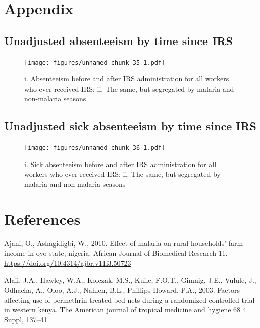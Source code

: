 \documentclass[]{article}
\begin{document}
\newpage

\section{Appendix}\label{appendix}

\subsection{Unadjusted absenteeism by time since
IRS}\label{unadjusted-absenteeism-by-time-since-irs}

\begin{figure}
\centering
\texttt{[image: figures/unnamed-chunk-35-1.pdf]}
\caption{i. Absenteeism before and after IRS administration for all
workers who ever received IRS; ii. The same, but segregated by malaria
and non-malaria seasons}
\end{figure}

\subsection{Unadjusted sick absenteeism by time since
IRS}\label{unadjusted-sick-absenteeism-by-time-since-irs}

\begin{figure}
\centering
\texttt{[image: figures/unnamed-chunk-36-1.pdf]}
\caption{i. Sick absenteeism before and after IRS administration for all
workers who ever received IRS; ii. The same, but segregated by malaria
and non-malaria seasons}
\end{figure}

\section*{References}\label{references}

\hypertarget{refs}{}
\hypertarget{ref-Ajani2010}{}
Ajani, O., Ashagidigbi, W., 2010. Effect of malaria on rural households'
farm income in oyo state, nigeria. African Journal of Biomedical
Research 11. \url{https://doi.org/10.4314/ajbr.v11i3.50723}

\hypertarget{ref-Alaii2003FactorsAU}{}
Alaii, J.A., Hawley, W.A., Kolczak, M.S., Kuile, F.O.T., Gimnig, J.E.,
Vulule, J., Odhacha, A., Oloo, A.J., Nahlen, B.L., Phillips-Howard,
P.A., 2003. Factors affecting use of permethrin-treated bed nets during
a randomized controlled trial in western kenya. The American journal of
tropical medicine and hygiene 68 4 Suppl, 137--41.
\end{document}

